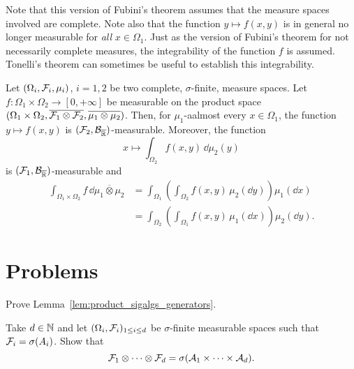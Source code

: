 Note that this version of Fubini's theorem assumes that the measure spaces involved are complete. 
Note also that the function $y \mapsto f(x,y)$ is in general no longer measurable for \emph{all} $x \in \Omega_1$. Just as the version of Fubini's theorem for not necessarily complete measures, the integrability of the function $f$ is assumed. Tonelli's theorem can sometimes be useful to establish this integrability.

\begin{theorem}
	Let $(\Omega_i, \mathcal F_i, \mu_i)$, $i=1,2$ be two complete, $\sigma$-finite, measure spaces. 
	Let $f : \Omega_1 \times \Omega_2 \to [0,+\infty]$ be measurable on the product space $(\Omega_1 \times \Omega_2, \overline{\mathcal F_1 \otimes \mathcal F_2}, \overline{\mu_1 \otimes \mu_2})$. Then, for $\mu_1$-aalmost every $x \in \Omega_1$, the function $y \mapsto f(x, y)$ is $(\mathcal F_2,\mathcal B_{\overline{\mathbb R}})$-measurable. Moreover, the function 
	\[
	x \mapsto \int_{\Omega_2} f(x,y)\, \dd \mu_2(y)
	\]
	is $(\mathcal F_1,\mathcal B_{\overline{\mathbb R}})$-measurable and
	\[
	\begin{split}
	\int_{\Omega_1 \times \Omega_2} f \,\dd \overline{\mu_1 \otimes \mu_2} 
	&= \int_{\Omega_1} \left( \int_{\Omega_2 } f(x,  y ) \,\mu_2(\dd y) \right) \mu_1(\dd x)\\
	&= \int_{\Omega_2} \left( \int_{\Omega_1} f(x, y)  \,\mu_1(\dd x) \right) \mu_2(\dd y).
	\end{split}
	\] 	
\end{theorem}


\section{Problems}

\begin{problem}\label{prb:product_sigalgs_generators}
Prove Lemma~\ref{lem:product_sigalgs_generators}.
\end{problem}

\begin{problem}
Take $d \in \mathbb N$ and let $(\Omega_i, \mathcal F_i)_{1 \le i \le d}$ be $\sigma$-finite measurable spaces such that $\mathcal F_i = \sigma(A_i)$. Show that
\[
	\mathcal F_1 \otimes \dots \otimes \mathcal F_d = \sigma(\mathcal A_1 \times \dots \times \mathcal A_d).
\]
\end{problem}

